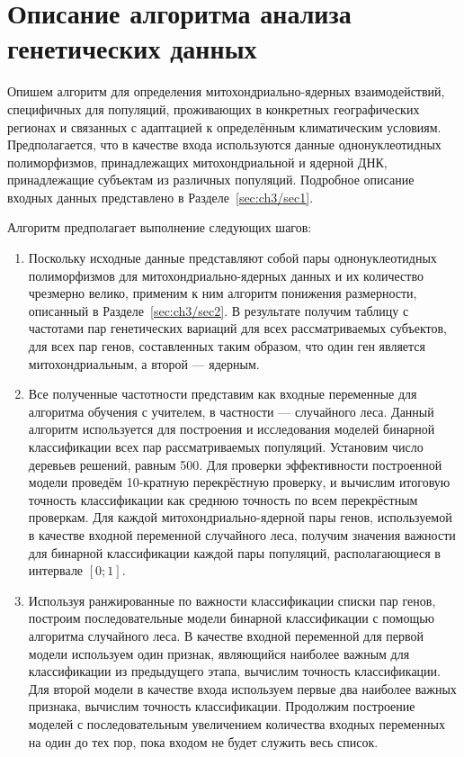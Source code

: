 \section{Описание алгоритма анализа генетических данных}\label{sec:ch3/sec3}

Опишем алгоритм для определения митохондриально-ядерных взаимодействий, специфичных для популяций, проживающих в конкретных географических регионах и связанных с адаптацией к определённым климатическим условиям. Предполагается, что в качестве входа используются данные однонуклеотидных полиморфизмов, принадлежащих митохондриальной и ядерной ДНК, принадлежащие субъектам из различных популяций. Подробное описание входных данных представлено в Разделе~\ref{sec:ch3/sec1}.

Алгоритм предполагает выполнение следующих шагов: 
\begin{enumerate}
	\item Поскольку исходные данные представляют собой пары однонуклеотидных полиморфизмов для митохондриально-ядерных данных и их количество чрезмерно велико, применим к ним алгоритм понижения размерности, описанный в Разделе~\ref{sec:ch3/sec2}. В результате получим таблицу с частотами пар генетических вариаций для всех рассматриваемых субъектов, для всех пар генов, составленных таким образом, что один ген является митохондриальным, а второй --- ядерным.
	\item Все полученные частотности представим как входные переменные для алгоритма обучения с учителем, в частности --- случайного леса. Данный алгоритм используется для построения и исследования моделей бинарной классификации всех пар рассматриваемых популяций. Установим число деревьев решений, равным 500. Для проверки эффективности построенной модели проведём 10-кратную перекрёстную проверку, и вычислим итоговую точность классификации как среднюю точность по всем перекрёстным проверкам. Для каждой митохондриально-ядерной пары генов, используемой в качестве входной переменной случайного леса, получим значения важности для бинарной классификации каждой пары популяций, располагающиеся в интервале $[0; 1]$.
	\item Используя ранжированные по важности классификации списки пар генов, построим последовательные модели бинарной классификации с помощью алгоритма случайного леса. В качестве входной переменной для первой модели используем один признак, являющийся наиболее важным для классификации из предыдущего этапа, вычислим точность классификации. Для второй модели в качестве входа используем первые два наиболее важных признака, вычислим точность классификации. Продолжим построение моделей с последовательным увеличением количества входных переменных на один до тех пор, пока входом не будет служить весь список. 

\end{enumerate}

